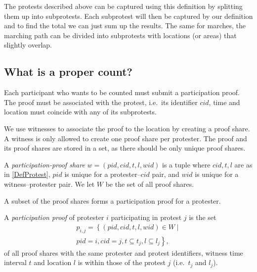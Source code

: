 The protests described above can be captured using this definition by splitting 
them up into subprotests.
Each subprotest will then be captured by our definition and to find the total 
we can just sum up the results.
The same for marches, the marching path can be divided into subprotests with 
locations (or areas) that slightly overlap.

\subsection{What is a proper count?}

Each participant who wants to be counted must submit a participation proof.
The proof must be associated with the protest, i.e.\ its identifier \(cid\), 
time and location must coincide with any of its subprotests.

We use witnesses to associate the proof to the location by creating a proof 
share.
A witness is only allowed to create one proof share per protester.
The proof and its proof shares are stored in a set, as there should be only 
unique proof shares.

\begin{definition}
  A \emph{participation-proof share} \(w = (pid, cid, t, l, wid)\) is a tuple 
  where
  \(cid, t, l\) are as in \cref{DefProtest},
  \(pid\) is unique for a protester--\(cid\) pair, and
  \(wid\) is unique for a witness--protester pair.
  We let \(W\) be the set of all proof shares.
\end{definition}

A subset of the proof shares forms a participation proof for a protester.

\begin{definition}
  A \emph{participation proof} of protester \(i\) participating in protest \(j\) 
  is the set
  \begin{multline}
    \nonumber
    p_{i, j} =
    \left\{ (pid, cid, t, l, wid)\in W \mid \right. \\
    \left. pid = i, cid = j,
    t \subseteq t_j, l\subseteq l_j \right\},
  \end{multline}
  of all proof shares with the same protester and protest identifiers, witness 
  time interval \(t\) and location \(l\) is within those of the protest \(j\) 
  (i.e.\ \(t_j\) and \(l_j\)).
\end{definition}

